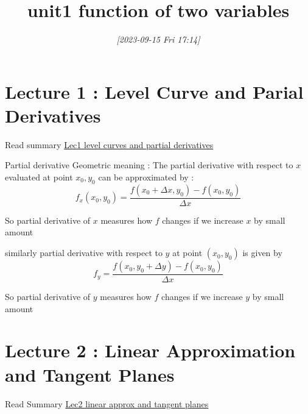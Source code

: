 \documentclass[11pt]{article}
\date{\textit{[2023-09-15 Fri 17:14]}}
\title{unit1 function of two variables}
\begin{document}
\maketitle
\tableofcontents


\section{Lecture 1 : Level Curve and Parial Derivatives}
\label{sec:org1e700a0}
Read summary \href{library/20230914T223615--lec1-level-curves-and-partial-derivatives\_\_differentiation\_mit1802.pdf}{Lec1 level curves and partial derivatives} 

Partial derivative Geometric meaning :
The partial derivative with respect to \(x\) evaluated at point
\(x_0 ,y_0\) can be approximated by :
\[
f_x(x_0,y_0) = \frac{{f(x_0 + \Delta x , y_0) - f(x_0,y_0) }}{\Delta x}
\]

So partial derivative of \(x\) measures how \(f\) changes  if we
increase \(x\) by small amount 

similarly partial derivative with respect to \(y\) at point \((x_0,y_0)\) is given by
\[
f_y = \frac{{f(x_0 , y_0 + \Delta y ) - f(x_0 , y_0) }}{\Delta x } 
\]

So partial derivative of \(y\) measures how \(f\) changes if we
increase \(y\) by small amount 

\section{Lecture 2 : Linear Approximation and Tangent Planes}
\label{sec:org4d18ee3}
Read Summary \href{library/20230915T163508--lec2-linear-approx-and-tangent-planes\_\_differentiation\_mit1802.pdf}{Lec2 linear approx and tangent planes}
\end{document}
